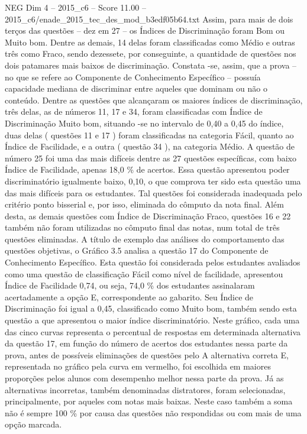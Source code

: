 \begin{textsample}{NEG Dim 4 – 2015\_c6 – Score 11.00 – 2015\_c6/enade\_2015\_tec\_des\_mod\_b3edf05b64.txt}
Assim, para mais de dois terços das questões – dez em 27 – os Índices de Discriminação foram Bom ou Muito bom.
Dentre as demais, 14 delas foram classificadas como Médio e outras três como Fraco, sendo dezessete, por conseguinte, a quantidade de questões nos dois patamares mais baixos de discriminação.
Constata -se, assim, que a prova – no que se refere ao Componente de Conhecimento Específico – possuía capacidade mediana de discriminar entre aqueles que dominam ou não o conteúdo.
Dentre as questões que alcançaram os maiores índices de discriminação, três delas, as de números 11, 17 e 34, foram classificadas com Índice de Discriminação Muito bom, situando -se no intervalo de 0,40 a 0,45 do índice, duas delas ( questões 11 e 17 ) foram classificadas na categoria Fácil, quanto ao Índice de Facilidade, e a outra ( questão 34 ), na categoria Médio.
A questão de número 25 foi uma das mais difíceis dentre as 27 questões específicas, com baixo Índice de Facilidade, apenas 18,0 \% de acertos.
Essa questão apresentou poder discriminatório igualmente baixo, 0,10, o que comprova ter sido esta questão uma das mais difíceis para os estudantes.
Tal questões foi considerada inadequada pelo critério ponto bisserial e, por isso, eliminada do cômputo da nota final.
Além desta, as demais questões com Índice de Discriminação Fraco, questões 16 e 22 também não foram utilizadas no cômputo final das notas, num total de três questões eliminadas.
A título de exemplo das análises do comportamento das questões objetivas, o Gráfico 3.5 analisa a questão 17 do Componente de Conhecimento Específico.
Esta questão foi considerada pelos estudantes avaliados como uma questão de classificação Fácil como nível de facilidade, apresentou Índice de Facilidade 0,74, ou seja, 74,0 \% dos estudantes assinalaram acertadamente a opção E, correspondente ao gabarito.
Seu Índice de Discriminação foi igual a 0,45, classificado como Muito bom, também sendo esta questão a que apresentou o maior índice discriminatório.
Neste gráfico, cada uma das cinco curvas representa o percentual de respostas em determinada alternativa da questão 17, em função do número de acertos dos estudantes nessa parte da prova, antes de possíveis eliminações de questões pelo A alternativa correta E, representada no gráfico pela curva em vermelho, foi escolhida em maiores proporções pelos alunos com desempenho melhor nessa parte da prova.
Já as alternativas incorretas, também denominadas distratores, foram selecionadas, principalmente, por aqueles com notas mais baixas.
Neste caso também a soma não é sempre 100 \% por causa das questões não respondidas ou com mais de uma opção marcada.

\end{textsample}
